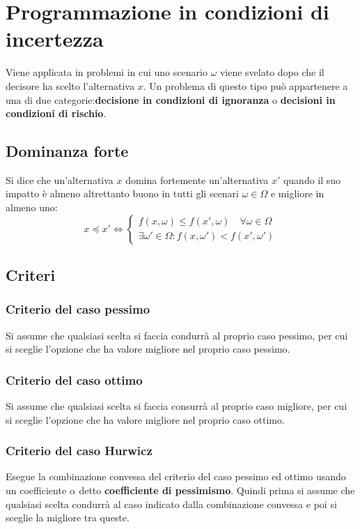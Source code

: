 \documentclass[\main/main.tex]{subfiles}
\begin{document}
\chapter{Programmazione in condizioni di incertezza}
Viene applicata in problemi in cui uno scenario $\omega$ viene svelato dopo che il decisore ha scelto l'alternativa $x$. Un problema di questo tipo può appartenere a una di due categorie:\textbf{decisione in condizioni di ignoranza} o \textbf{decisioni in condizioni di rischio}.

\section{Dominanza forte}

\begin{definition}
  Si dice che un'alternativa $x$ domina fortemente un'alternativa $x'$ quando il suo impatto è almeno altrettanto buono in tutti gli scenari $\omega \in \Omega$ e migliore in almeno uno:
  \[
    x \preceq x' \Leftrightarrow \begin{cases}
      f(x,\omega) \leq f(x',\omega) \quad \forall \omega \in \Omega \\
      \exists \omega' \in \Omega: f(x,\omega') < f(x',\omega')
    \end{cases}
  \]
\end{definition}

\section{Criteri}
\subsection{Criterio del caso pessimo}
Si assume che qualsiasi scelta si faccia condurrà al proprio caso pessimo, per cui si sceglie l'opzione che ha valore migliore nel proprio caso pessimo.

\subsection{Criterio del caso ottimo}
Si assume che qualsiasi scelta si faccia consurrà al proprio caso migliore, per cui si sceglie l'opzione che ha valore migliore nel proprio caso ottimo.

\subsection{Criterio del caso Hurwicz}
Esegue la combinazione convessa del criterio del caso pessimo ed ottimo usando un coefficiente $\alpha$ detto \textbf{coefficiente di pessimismo}. Quindi prima si assume che qualsiasi scelta condurrà al caso indicato dalla combinazione convessa e poi si sceglie la migliore tra queste.
\end{document}
